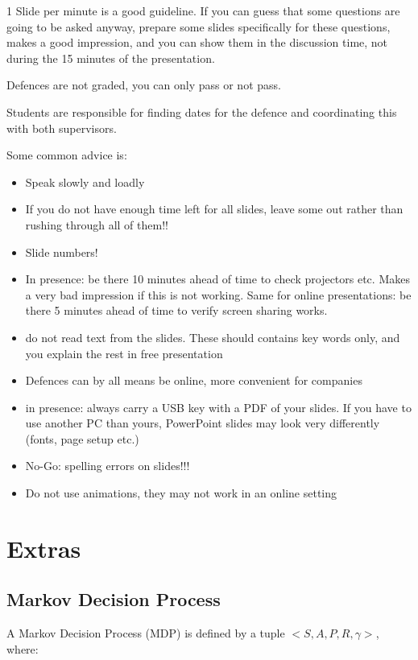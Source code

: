 \documentclass[12pt,oneside]{article}
\begin{document}
1 Slide per minute is a good guideline. If you can guess that some questions are going to be asked anyway, prepare some slides specifically for these questions, makes a good impression, and you can show them in the discussion time, not during the 15 minutes of the presentation.

Defences are not graded, you can only pass or not pass. 

Students are responsible for finding dates for the defence and coordinating this with both supervisors. 

Some common advice is:
\begin{itemize}
    \item Speak slowly and loadly
    \item If you do not have enough time left for all slides, leave some out rather than rushing through all of them!!
    \item Slide numbers!
    \item In presence: be there 10 minutes ahead of time to check projectors etc. Makes a very bad impression if this is not working. Same for online presentations: be there 5 minutes ahead of time to verify screen sharing works.
    \item do not read text from the slides. These should contains key words only, and you explain the rest in free presentation
    \item Defences can by all means be online, more convenient for companies
    \item in presence: always carry a USB key with a PDF of your slides. If you have to use another PC than yours, PowerPoint slides may look very differently (fonts, page setup etc.)
    \item No-Go: spelling errors on slides!!!
    \item Do not use animations, they may not work in an online setting
\end{itemize}



\section{Extras}
\subsection{Markov Decision Process}
A Markov Decision Process (MDP) is defined by a tuple $<S, A, P, R, \gamma>$, where:
\end{document}
